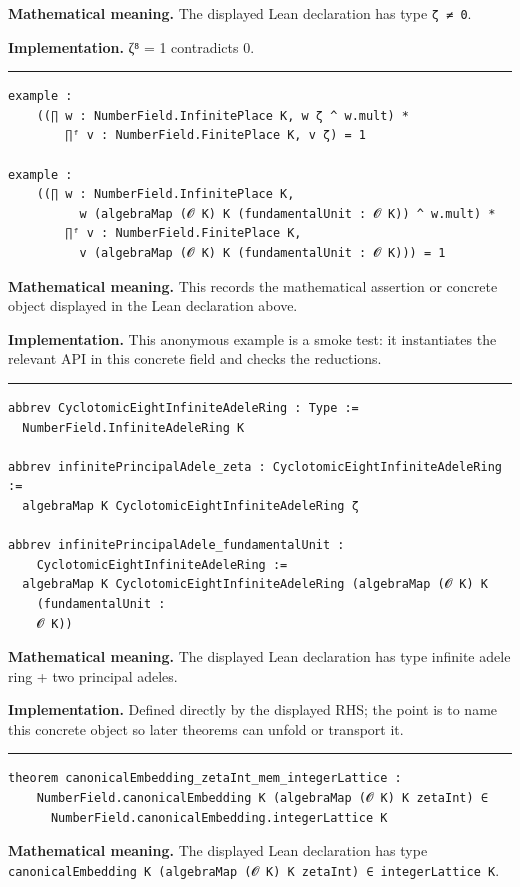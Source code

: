 \documentclass[UTF8,a4paper,11pt,fontset=fandol]{ctexart}
\theoremstyle{definition}
\newcommand{\statementsep}{\par\medskip\hrule\medskip}
\begin{document}
\noindent\textbf{Mathematical meaning.} The displayed Lean declaration has type \texttt{ζ ≠ 0}.\par
\noindent\textbf{Implementation.} ζ⁸ = 1 contradicts 0.\par
\statementsep
\begin{verbatim}
example :
    ((∏ w : NumberField.InfinitePlace K, w ζ ^ w.mult) *
        ∏ᶠ v : NumberField.FinitePlace K, v ζ) = 1

example :
    ((∏ w : NumberField.InfinitePlace K,
          w (algebraMap (𝓞 K) K (fundamentalUnit : 𝓞 K)) ^ w.mult) *
        ∏ᶠ v : NumberField.FinitePlace K,
          v (algebraMap (𝓞 K) K (fundamentalUnit : 𝓞 K))) = 1
\end{verbatim}
\noindent\textbf{Mathematical meaning.} This records the mathematical assertion or concrete object displayed in the Lean declaration above.\par
\noindent\textbf{Implementation.} This anonymous example is a smoke test: it instantiates the relevant API in this concrete field and checks the reductions.\par
\statementsep
\begin{verbatim}
abbrev CyclotomicEightInfiniteAdeleRing : Type :=
  NumberField.InfiniteAdeleRing K

abbrev infinitePrincipalAdele_zeta : CyclotomicEightInfiniteAdeleRing :=
  algebraMap K CyclotomicEightInfiniteAdeleRing ζ

abbrev infinitePrincipalAdele_fundamentalUnit :
    CyclotomicEightInfiniteAdeleRing :=
  algebraMap K CyclotomicEightInfiniteAdeleRing (algebraMap (𝓞 K) K
    (fundamentalUnit :
    𝓞 K))
\end{verbatim}
\noindent\textbf{Mathematical meaning.} The displayed Lean declaration has type infinite adele ring + two principal adeles.\par
\noindent\textbf{Implementation.} Defined directly by the displayed RHS; the point is to name this concrete object so later theorems can unfold or transport it.\par
\statementsep
\begin{verbatim}
theorem canonicalEmbedding_zetaInt_mem_integerLattice :
    NumberField.canonicalEmbedding K (algebraMap (𝓞 K) K zetaInt) ∈
      NumberField.canonicalEmbedding.integerLattice K
\end{verbatim}
\noindent\textbf{Mathematical meaning.} The displayed Lean declaration has type \texttt{canonicalEmbedding K (algebraMap (𝓞 K) K zetaInt) ∈ integerLattice K}.\par
\end{document}
